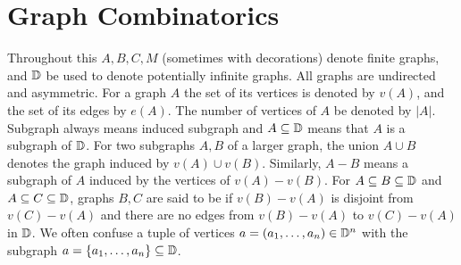 \section{Graph Combinatorics}
Throughout this \chapa $A, B, C, M$ (sometimes with decorations) denote finite graphs,
and $\mathbb D$ be used to denote potentially infinite graphs.
All graphs are undirected and asymmetric.
For a graph $A$ the set of its vertices is denoted by $v(A)$, and the set of its edges by $e(A)$.
The number of vertices of $A$ be denoted by $|A|$.
Subgraph always means induced subgraph and $A \subseteq \mathbb D$ means that $A$ is a subgraph of $\mathbb D$.
For two subgraphs $A, B$ of a larger graph, the union $A \cup B$ denotes the graph induced by $v(A) \cup v(B)$.
Similarly, $A - B$ means a subgraph of $A$ induced by the vertices of $v(A) - v(B)$.
For $A \subseteq B \subseteq \mathbb D$ and $A \subseteq C \subseteq \mathbb D$,
graphs $B,C$ are said to be  if $v(B) - v(A)$ is disjoint from $v(C) - v(A)$
and there are no edges from $v(B) - v(A)$ to $v(C) - v(A)$ in $\mathbb D$.
We often confuse a tuple of vertices $a = (a_1, \ldots, a_n) \in \mathbb D^n$ with the subgraph $a = \left\{a_1, \ldots, a_n\right\} \subseteq \mathbb D$.

